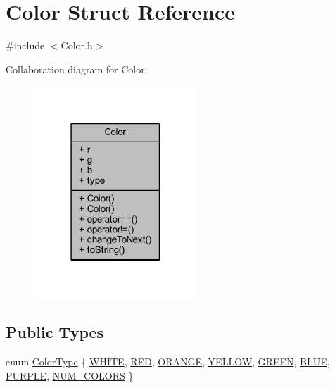 \hypertarget{struct_color}{}\section{Color Struct Reference}
\label{struct_color}


{\ttfamily \#include $<$Color.\+h$>$}



Collaboration diagram for Color\+:
\nopagebreak
\begin{figure}[H]
\begin{center}
\leavevmode
\includegraphics[width=174pt]{struct_color__coll__graph}
\end{center}
\end{figure}
\subsection*{Public Types}
\begin{DoxyCompactItemize}
\item 
enum \hyperlink{struct_color_a9216c50419c87f87e2de51ce5bd73be9}{Color\+Type} \{ \newline
\hyperlink{struct_color_a9216c50419c87f87e2de51ce5bd73be9a523c4a74d174943a6216bd194664049c}{W\+H\+I\+TE}, 
\hyperlink{struct_color_a9216c50419c87f87e2de51ce5bd73be9a83fd16c22eacbb2418be16d077ae4ec9}{R\+ED}, 
\hyperlink{struct_color_a9216c50419c87f87e2de51ce5bd73be9a2bf53c7c40eab4ffd0648c0a5a94e508}{O\+R\+A\+N\+GE}, 
\hyperlink{struct_color_a9216c50419c87f87e2de51ce5bd73be9abfe87a6ce7a4878150168e97f9ffa550}{Y\+E\+L\+L\+OW}, 
\newline
\hyperlink{struct_color_a9216c50419c87f87e2de51ce5bd73be9a08c2af9e860f4aac479bb85f9f0bf336}{G\+R\+E\+EN}, 
\hyperlink{struct_color_a9216c50419c87f87e2de51ce5bd73be9a7d7d2c53cd46c64ffcef1f5dbe71ccba}{B\+L\+UE}, 
\hyperlink{struct_color_a9216c50419c87f87e2de51ce5bd73be9a0fda23f77a5da1437f3c64c9bbbf83a9}{P\+U\+R\+P\+LE}, 
\hyperlink{struct_color_a9216c50419c87f87e2de51ce5bd73be9a0cc2af12a4269e0cb95a5a052bc4e1fc}{N\+U\+M\+\_\+\+C\+O\+L\+O\+RS}
 \}
\end{DoxyCompactItemize}

